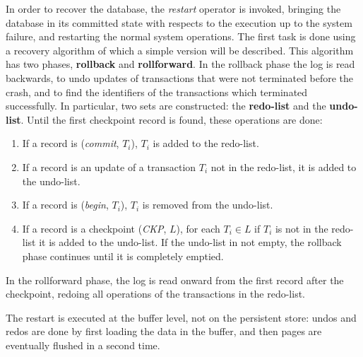 In order to recover the database, the \textit{restart} operator is invoked, bringing the database in its committed state with respects to the execution up to the system failure, and restarting the normal system operations. The first task is done using a recovery algorithm of which a simple version will be described. This algorithm has two phases, \textbf{rollback} and \textbf{rollforward}. In the rollback phase the log is read backwards, to undo updates of transactions that were not terminated before the crash, and to find the identifiers of the transactions which terminated successfully. In particular, two sets are constructed: the \textbf{redo-list} and the \textbf{undo-list}. Until the first checkpoint record is found, these operations are done:
\begin{enumerate}
    \item If a record is (\textit{commit}, $T_i$), $T_i$ is added to the redo-list.
    
    \item If a record is an update of a transaction $T_i$ not in the redo-list, it is added to the undo-list.

    \item If a record is (\textit{begin}, $T_i$), $T_i$ is removed from the undo-list.

    \item If a record is a checkpoint (\textit{CKP}, $L$), for each $T_i \in L$ if $T_i$ is not in the redo-list it is added to the undo-list. If the undo-list in not empty, the rollback phase continues until it is completely emptied.
\end{enumerate}
In the rollforward phase, the log is read onward from the first record after the checkpoint, redoing all operations of the transactions in the redo-list.

The restart is executed at the buffer level, not on the persistent store: undos and redos are done by first loading the data in the buffer, and then pages are eventually flushed in a second time.

